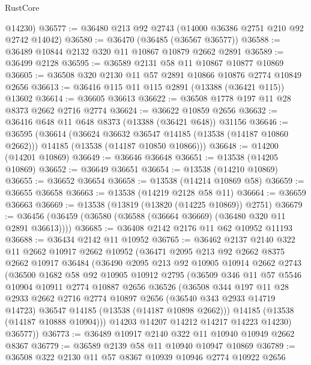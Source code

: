 \begin{lexlean}{RustCore}
\begin{coremodule}
      @14230)
@36577 := @36480 @213 @92 @2743 (@14000 @36386 @2751 @210 @92 @2742 @14042)
@36580 := @36470 (@36485 (@36567 @36577))
@36588 := @36489 @10844 @2132 @320 @11 @10867 @10879 @2662 @2891
@36589 := @36499 @2128
@36595 := @36589 @2131 @58 @11 @10867 @10877 @10869
@36605 := @36508 @320 @2130 @11 @57 @2891 @10866 @10876 @2774 @10849 @2656
@36613 := @36416 @115 @11 @115 @2891 (@13388 (@36421 @115)) @13602
@36614 := @36605 @36613
@36622 := @36508 @1778 @197 @11 @28 @8373 @2662 @2716 @2774
@36624 := @36622 @10859 @2656
@36632 := @36416 @648 @11 @648 @8373 (@13388 (@36421 @648)) @31156
@36646 := @36595
    (@36614
      (@36624 @36632 @36547 @14185 (@13538 (@14187 @10860 @2662)))
      @14185
      (@13538 (@14187 @10850 @10866)))
@36648 := @14200 (@14201 @10869)
@36649 := @36646 @36648
@36651 := @13538 (@14205 @10869)
@36652 := @36649 @36651
@36654 := @13538 (@14210 @10869)
@36655 := @36652 @36654
@36658 := @13538 (@14214 @10869 @58)
@36659 := @36655 @36658
@36663 := @13538 (@14219 @2128 @58 @11)
@36664 := @36659 @36663
@36669 := @13538 (@13819 (@13820 (@14225 @10869)) @2751)
@36679 := @36456 (@36459 (@36580 (@36588 (@36664 @36669) (@36480 @320 @11 @2891 @36613))))
@36685 := @36408 @2142 @2176 @11 @62 @10952 @11193
@36688 := @36434 @2142 @11 @10952
@36765 := @36462
    @2137
    @2140
    @322
    @11
    @2662
    @10917
    @2662
    @10952
    (@36471
      @2095
      @213
      @92
      @2662
      @8375
      @2662
      @10917
      @36484
      (@36490
        @2095
        @213
        @92
        @10905
        @10914
        @2662
        @2743
        (@36500
          @1682
          @58
          @92
          @10905
          @10912
          @2795
          (@36509
            @346
            @11
            @57
            @5546
            @10904
            @10911
            @2774
            @10887
            @2656
            @36526
            (@36508
              @344
              @197
              @11
              @28
              @2933
              @2662
              @2716
              @2774
              @10897
              @2656
              (@36540 @343 @2933 @14719 @14723)
              @36547
              @14185
              (@13538 (@14187 @10898 @2662)))
            @14185
            (@13538 (@14187 @10888 @10904)))
          @14203
          @14207
          @14212
          @14217
          @14223
          @14230)
        @36577))
@36773 := @36489 @10917 @2140 @322 @11 @10940 @10949 @2662 @8367
@36779 := @36589 @2139 @58 @11 @10940 @10947 @10869
@36789 := @36508 @322 @2130 @11 @57 @8367 @10939 @10946 @2774 @10922 @2656

\end{coremodule}
\end{lexlean}
